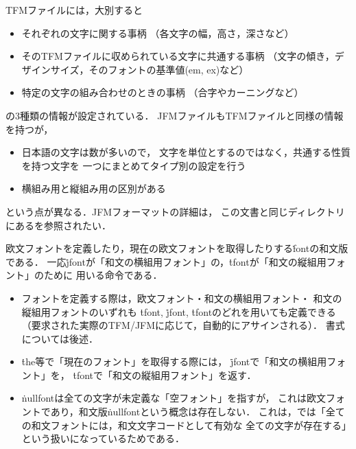 \documentclass[a4paper,11pt,nomag,dvipdfmx]{jsarticle}
\begin{document}
TFMファイルには，大別すると
\begin{itemize}
 \item それぞれの文字に関する事柄
   （各文字の幅，高さ，深さなど）
 \item そのTFMファイルに収められている文字に共通する事柄
   （文字の傾き，デザインサイズ，そのフォントの基準値(em, ex)など）
 \item 特定の文字の組み合わせのときの事柄
   （合字やカーニングなど）
\end{itemize}
の3種類の情報が設定されている．
JFMファイルもTFMファイルと同様の情報を持つが，
\begin{itemize}
 \item 日本語の文字は数が多いので，
   文字を単位とするのではなく，共通する性質を持つ文字を
   一つにまとめてタイプ別の設定を行う
 \item 横組み用と縦組み用の区別がある
\end{itemize}
という点が異なる．JFMフォーマットの詳細は，
この文書と同じディレクトリにある\cite{jfm}を参照されたい．


\begin{cslist}
  欧文フォントを定義したり，現在の欧文フォントを取得したりする\.{font}の和文版である．
  一応\.{jfont}が「和文の横組用フォント」の，\.{tfont}が「和文の縦組用フォント」のために
  用いる命令である．
\begin{itemize}
 \item フォントを定義する際は，欧文フォント・和文の横組用フォント・
       和文の縦組用フォントのいずれも
       \.{tfont}, \.{jfont}, \.{tfont}のどれを用いても定義できる
       （要求された実際のTFM/JFMに応じて，自動的にアサインされる）．
       書式については後述．
 \item \.{the}等で「現在のフォント」を取得する際には，
       \.{jfont}で「和文の横組用フォント」を，
       \.{tfont}で「和文の縦組用フォント」を返す．
 \item \.{nullfont}は全ての文字が未定義な「空フォント」を指すが，
  これは欧文フォントであり，和文版\.{nullfont}という概念は存在しない．
  これは，\pTeX では「全ての和文フォントには，和文文字コードとして有効な
  全ての文字が存在する」という扱いになっているためである．
\end{itemize}
\end{cslist}
\end{document}
